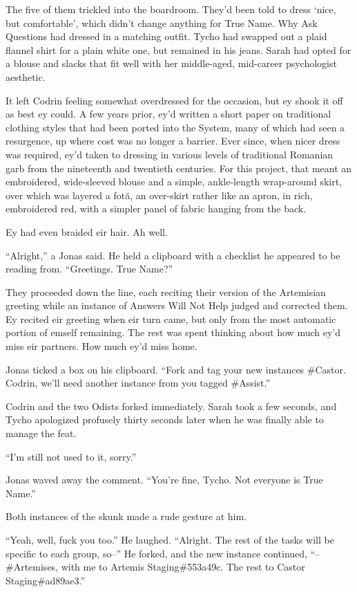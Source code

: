 The five of them trickled into the boardroom. They'd been told to dress `nice, but comfortable', which didn't change anything for True Name. Why Ask Questions had dressed in a matching outfit. Tycho had swapped out a plaid flannel shirt for a plain white one, but remained in his jeans. Sarah had opted for a blouse and slacks that fit well with her middle-aged, mid-career psychologist aesthetic.

It left Codrin feeling somewhat overdressed for the occasion, but ey shook it off as best ey could. A few years prior, ey'd written a short paper on traditional clothing styles that had been ported into the System, many of which had seen a resurgence, up where cost was no longer a barrier. Ever since, when nicer dress was required, ey'd taken to dressing in various levels of traditional Romanian garb from the nineteenth and twentieth centuries. For this project, that meant an embroidered, wide-sleeved blouse and a simple, ankle-length wrap-around skirt, over which was layered a fotă, an over-skirt rather like an apron, in rich, embroidered red, with a simpler panel of fabric hanging from the back.

Ey had even braided eir hair. Ah well.

``Alright,'' a Jonas said. He held a clipboard with a checklist he appeared to be reading from. ``Greetings. True Name?''

They proceeded down the line, each reciting their version of the Artemisian greeting while an instance of Answers Will Not Help judged and corrected them. Ey recited eir greeting when eir turn came, but only from the most automatic portion of emself remaining. The rest was spent thinking about how much ey'd miss eir partners. How much ey'd miss home.

Jonas ticked a box on his clipboard. ``Fork and tag your new instances \#Castor. Codrin, we'll need another instance from you tagged \#Assist.''

Codrin and the two Odists forked immediately. Sarah took a few seconds, and Tycho apologized profusely thirty seconds later when he was finally able to manage the feat.

``I'm still not used to it, sorry.''

Jonas waved away the comment. ``You're fine, Tycho. Not everyone is True Name.''

Both instances of the skunk made a rude gesture at him.

``Yeah, well, fuck you too.'' He laughed. ``Alright. The rest of the tasks will be specific to each group, so--'' He forked, and the new instance continued, ``--\#Artemises, with me to Artemis Staging\#553a49c. The rest to Castor Staging\#ad89ae3.''

